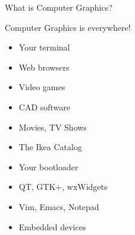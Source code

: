 \documentclass{lug}
\begin{document}
\begin{frame}{What is Computer Graphics?}
    \noindent
    \begin{minipage}{.65\textwidth}
        Computer Graphics is everywhere!
        \begin{itemize}
            \item Your terminal \\
            \item Web browsers \\
            \item Video games \\
            \item CAD software \\
            \item Movies, TV Shows \\
            \item The Ikea Catalog \\
            \item Your bootloader \\
            \item QT, GTK+, wxWidgets \\
            \item Vim, Emacs, Notepad \\
            \item Embedded devices \\
        \end{itemize}
    \end{minipage}%
    \begin{minipage}{.35\textwidth}

\end{minipage}
\end{frame}
\end{document}

